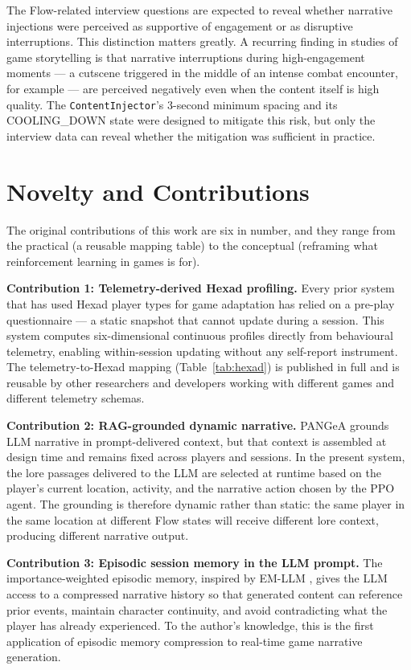 The Flow-related interview questions are expected to reveal whether narrative injections were perceived as supportive of engagement or as disruptive interruptions. This distinction matters greatly. A recurring finding in studies of game storytelling is that narrative interruptions during high-engagement moments --- a cutscene triggered in the middle of an intense combat encounter, for example --- are perceived negatively even when the content itself is high quality. The \texttt{ContentInjector}'s 3-second minimum spacing and its COOLING\_DOWN state were designed to mitigate this risk, but only the interview data can reveal whether the mitigation was sufficient in practice.

\section{Novelty and Contributions}

The original contributions of this work are six in number, and they range from the practical (a reusable mapping table) to the conceptual (reframing what reinforcement learning in games is for).

\textbf{Contribution 1: Telemetry-derived Hexad profiling.} Every prior system that has used Hexad player types for game adaptation has relied on a pre-play questionnaire \citep{tondello2016hexad} --- a static snapshot that cannot update during a session. This system computes six-dimensional continuous profiles directly from behavioural telemetry, enabling within-session updating without any self-report instrument. The telemetry-to-Hexad mapping (Table~\ref{tab:hexad}) is published in full and is reusable by other researchers and developers working with different games and different telemetry schemas.

\textbf{Contribution 2: RAG-grounded dynamic narrative.} PANGeA \citep{todd2024pangea} grounds LLM narrative in prompt-delivered context, but that context is assembled at design time and remains fixed across players and sessions. In the present system, the lore passages delivered to the LLM are selected at runtime based on the player's current location, activity, and the narrative action chosen by the PPO agent. The grounding is therefore dynamic rather than static: the same player in the same location at different Flow states will receive different lore context, producing different narrative output.

\textbf{Contribution 3: Episodic session memory in the LLM prompt.} The importance-weighted episodic memory, inspired by EM-LLM \citep{fountas2024episodic}, gives the LLM access to a compressed narrative history so that generated content can reference prior events, maintain character continuity, and avoid contradicting what the player has already experienced. To the author's knowledge, this is the first application of episodic memory compression to real-time game narrative generation.

